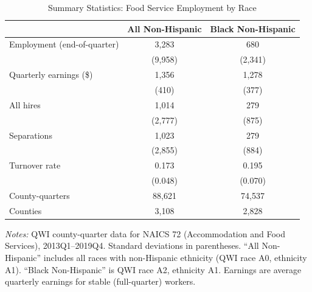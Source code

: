 \begin{table}[htbp]
\centering
\caption{Summary Statistics: Food Service Employment by Race}
\label{tab:summary}
\begin{tabular}{lcc}
\hline\hline
 & All Non-Hispanic & Black Non-Hispanic \\
\hline
Employment (end-of-quarter) & 3,283 & 680 \\
 & (9,958) & (2,341) \\
Quarterly earnings (\$) & 1,356 & 1,278 \\
 & (410) & (377) \\
All hires & 1,014 & 279 \\
 & (2,777) & (875) \\
Separations & 1,023 & 279 \\
 & (2,855) & (884) \\
Turnover rate & 0.173 & 0.195 \\
 & (0.048) & (0.070) \\
\hline
County-quarters & 88,621 & 74,537 \\
Counties & 3,108 & 2,828 \\
\hline\hline
\end{tabular}
\begin{tablenotes}
\small
\item \textit{Notes:} QWI county-quarter data for NAICS 72 (Accommodation and Food Services), 
2013Q1--2019Q4. Standard deviations in parentheses. ``All Non-Hispanic'' includes all races 
with non-Hispanic ethnicity (QWI race A0, ethnicity A1). ``Black Non-Hispanic'' is QWI race 
A2, ethnicity A1. Earnings are average quarterly earnings for stable (full-quarter) workers.
\end{tablenotes}
\end{table}
